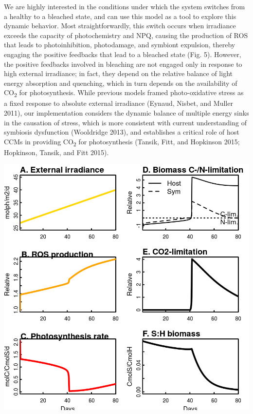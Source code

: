 \documentclass[]{elsarticle} %
\makeatletter
\def\maxwidth{\ifdim\Gin@nat@width>\linewidth\linewidth
\else\Gin@nat@width\fi}
\let\Oldincludegraphics\includegraphics
\renewcommand{\includegraphics}[1]{\Oldincludegraphics[width=\maxwidth]{#1}}
\makeatother
\begin{document}
We are highly interested in the conditions under which the system
switches from a healthy to a bleached state, and can use this model as a
tool to explore this dynamic behavior. Most straightforwardly, this
switch occurs when irradiance exceeds the capacity of photochemistry and
NPQ, causing the production of ROS that leads to photoinhibition,
photodamage, and symbiont expulsion, thereby engaging the positive
feedbacks that lead to a bleached state (Fig. 5). However, the positive
feedbacks involved in bleaching are not engaged only in response to high
external irradiance; in fact, they depend on the relative balance of
light energy absorption and quenching, which in turn depends on the
availability of CO\textsubscript{2} for photosynthesis. While previous
models framed photo-oxidative stress as a fixed response to absolute
external irradiance (Eynaud, Nisbet, and Muller 2011), our
implementation considers the dynamic balance of multiple energy sinks in
the causation of stress, which is more consistent with current
understanding of symbiosis dysfunction (Wooldridge 2013), and
establishes a critical role of host CCMs in providing
CO\textsubscript{2} for photosynthesis (Tansik, Fitt, and Hopkinson
2015; Hopkinson, Tansik, and Fitt 2015).

\includegraphics{../img/Fig5.png}
\end{document}

